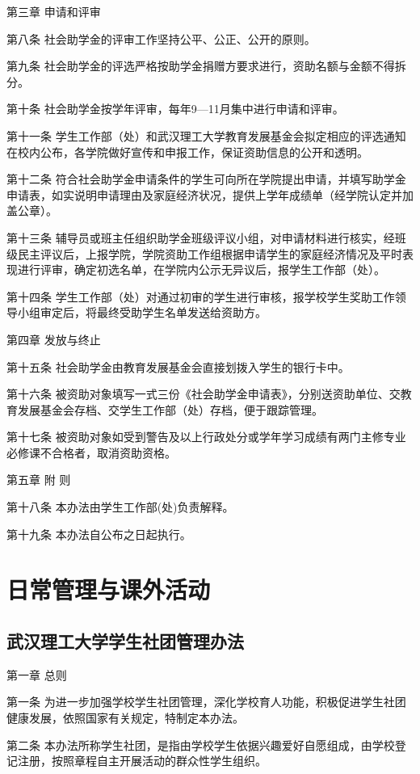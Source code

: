 \documentclass[UTF8,12pt,a4paper]{report}
\begin{document}
第三章 申请和评审

第八条 社会助学金的评审工作坚持公平、公正、公开的原则。

第九条 社会助学金的评选严格按助学金捐赠方要求进行，资助名额与金额不得拆分。

第十条 社会助学金按学年评审，每年9—11月集中进行申请和评审。

第十一条 学生工作部（处）和武汉理工大学教育发展基金会拟定相应的评选通知在校内公布，各学院做好宣传和申报工作，保证资助信息的公开和透明。

第十二条 符合社会助学金申请条件的学生可向所在学院提出申请，并填写助学金申请表，如实说明申请理由及家庭经济状况，提供上学年成绩单（经学院认定并加盖公章）。

第十三条 辅导员或班主任组织助学金班级评议小组，对申请材料进行核实，经班级民主评议后，上报学院，学院资助工作组根据申请学生的家庭经济情况及平时表现进行评审，确定初选名单，在学院内公示无异议后，报学生工作部（处）。

第十四条 学生工作部（处）对通过初审的学生进行审核，报学校学生奖助工作领导小组审定后，将最终受助学生名单发送给资助方。

第四章 发放与终止

第十五条 社会助学金由教育发展基金会直接划拨入学生的银行卡中。

第十六条 被资助对象填写一式三份《社会助学金申请表》，分别送资助单位、交教育发展基金会存档、交学生工作部（处）存档，便于跟踪管理。

第十七条 被资助对象如受到警告及以上行政处分或学年学习成绩有两门主修专业必修课不合格者，取消资助资格。

第五章 附 则

第十八条 本办法由学生工作部(处)负责解释。

第十九条 本办法自公布之日起执行。

\part{日常管理与课外活动}
\chapter{武汉理工大学学生社团管理办法}
第一章  总则

第一条  为进一步加强学校学生社团管理，深化学校育人功能，积极促进学生社团健康发展，依照国家有关规定，特制定本办法。

第二条  本办法所称学生社团，是指由学校学生依据兴趣爱好自愿组成，由学校登记注册，按照章程自主开展活动的群众性学生组织。
\end{document}
